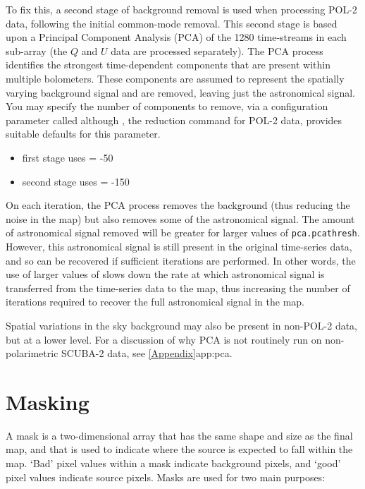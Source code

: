 To fix this, a second stage of background removal is used when processing
POL-2 data, following the initial common-mode removal. This second stage
is based upon a Principal Component Analysis (PCA) of the 1280
time-streams in each sub-array (the $Q$ and $U$ data are processed
separately). The PCA process identifies the strongest time-dependent
components that are present within multiple bolometers. These components
are assumed to represent the spatially varying background signal and are
removed, leaving just the astronomical signal. You may specify the number
of components to remove, via a  configuration
parameter called  although \poltwomap,
the reduction command for POL-2 data, provides suitable defaults for this parameter.

\begin{itemize}
\item first stage uses  = -50
\item second stage uses  = -150
\end{itemize}

On each  iteration, the PCA process removes the background (thus
reducing the noise in the map) but also removes some of the astronomical
signal. The amount of astronomical signal removed will be greater for
larger values of \texttt{pca.pcathresh}. However, this astronomical
signal is still present in the original time-series data, and so can be
recovered if sufficient  iterations are performed. In other words,
the use of larger values of  slows down the rate at
which astronomical signal is transferred from the time-series data to the
map, thus increasing the number of iterations required to recover the
full astronomical signal in the map.

Spatial variations in the sky background may also be present in non-POL-2
data, but at a lower level. For a discussion of why PCA is not routinely
run on non-polarimetric SCUBA-2 data, see \cref{Appendix}{app:pca}{}.



\section{Masking}
A mask is a two-dimensional array that has the same shape and size as
the final map, and that is used to indicate where the source is
expected to fall within the map. `Bad' pixel values within a mask
indicate background pixels, and `good' pixel values indicate source
pixels. Masks are used for two main purposes:

